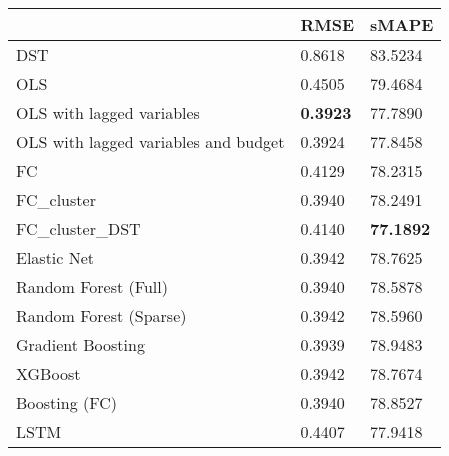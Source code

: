 \begin{tabular}{lll}
\toprule
 & RMSE & sMAPE \\
\midrule
DST & 0.8618 & 83.5234 \\
OLS & 0.4505 & 79.4684 \\
OLS with lagged variables & \textbf{0.3923} & 77.7890 \\
OLS with lagged variables and budget & 0.3924 & 77.8458 \\
FC & 0.4129 & 78.2315 \\
FC_cluster & 0.3940 & 78.2491 \\
FC_cluster_DST & 0.4140 & \textbf{77.1892} \\
Elastic Net & 0.3942 & 78.7625 \\
Random Forest (Full) & 0.3940 & 78.5878 \\
Random Forest (Sparse) & 0.3942 & 78.5960 \\
Gradient Boosting & 0.3939 & 78.9483 \\
XGBoost & 0.3942 & 78.7674 \\
Boosting (FC) & 0.3940 & 78.8527 \\
LSTM & 0.4407 & 77.9418 \\
\bottomrule
\end{tabular}
